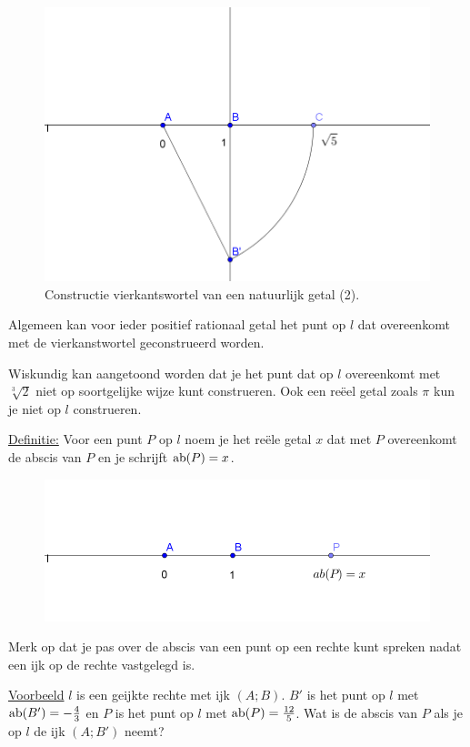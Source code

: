 \begin{figure}[h]
\begin{center}
\includegraphics[width=.5\linewidth]{4_opp_inhoud_an_meetk/inputs/AMTekst1Fig8}
\caption{Constructie vierkantswortel van een natuurlijk getal (2).}
\label{4.2.1_fig_reeel_fig2}
\end{center}
\end{figure}

Algemeen kan voor ieder positief rationaal getal het punt op $l$ dat overeenkomt met de vierkanstwortel geconstrueerd worden.

Wiskundig kan aangetoond worden dat je het punt dat op $l$ overeenkomt met $\sqrt[3]{2}$ niet op soortgelijke wijze kunt construeren.
Ook een re\"eel getal zoals $\pi$ kun je niet op $l$ construeren.\vspace{2mm}

\noindent \underline{Definitie:} Voor een punt $P$ op $l$ noem je het re\"ele getal $x$ dat met $P$ overeenkomt de abscis van $P$ en je schrijft $\operatorname{ab} (P)=x$.

\begin{figure}[ht]
\begin{center}
\includegraphics[height=3 cm]{4_opp_inhoud_an_meetk/inputs/AMTekst1Fig9}
\end{center}
\end{figure}

Merk op dat je pas over de abscis van een punt op een rechte kunt spreken nadat een ijk op de rechte vastgelegd is.\vspace{2mm}

\noindent \underline{Voorbeeld} 
$l$ is een geijkte rechte met ijk $(A;B)$.
$B'$ is het punt op $l$ met $\operatorname{ab} (B')=-\frac{4}{3}$ en $P$ is het punt op $l$ met $\operatorname{ab} (P)=\frac{12}{5}$.
Wat is de abscis van $P$ als je op $l$ de ijk $(A;B')$ neemt?

